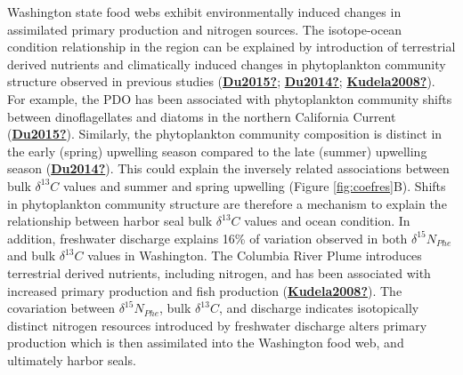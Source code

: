 \documentclass [11pt, proquest] {uwthesis}[2015/03/03]
\begin{document}
Washington state food webs exhibit environmentally induced changes in assimilated primary production and nitrogen sources. The isotope-ocean condition relationship in the region can be explained by introduction of terrestrial derived nutrients and climatically induced changes in phytoplankton community structure observed in previous studies (\protect\hyperlink{ref-Du2015}{\textbf{Du2015?}}; \protect\hyperlink{ref-Du2014}{\textbf{Du2014?}}; \protect\hyperlink{ref-Kudela2008}{\textbf{Kudela2008?}}). For example, the PDO has been associated with phytoplankton community shifts between dinoflagellates and diatoms in the northern California Current (\protect\hyperlink{ref-Du2015}{\textbf{Du2015?}}). Similarly, the phytoplankton community composition is distinct in the early (spring) upwelling season compared to the late (summer) upwelling season (\protect\hyperlink{ref-Du2014}{\textbf{Du2014?}}). This could explain the inversely related associations between bulk \(\delta^{13}C\) values and summer and spring upwelling (Figure \ref{fig:coefres}B). Shifts in phytoplankton community structure are therefore a mechanism to explain the relationship between harbor seal bulk \(\delta^{13}C\) values and ocean condition. In addition, freshwater discharge explains 16\% of variation observed in both \(\delta^{15}N_{Phe}\) and bulk \(\delta^{13}C\) values in Washington. The Columbia River Plume introduces terrestrial derived nutrients, including nitrogen, and has been associated with increased primary production and fish production (\protect\hyperlink{ref-Kudela2008}{\textbf{Kudela2008?}}). The covariation between \(\delta^{15}N_{Phe}\), bulk \(\delta^{13}C\), and discharge indicates isotopically distinct nitrogen resources introduced by freshwater discharge alters primary production which is then assimilated into the Washington food web, and ultimately harbor seals.
\end{document}
